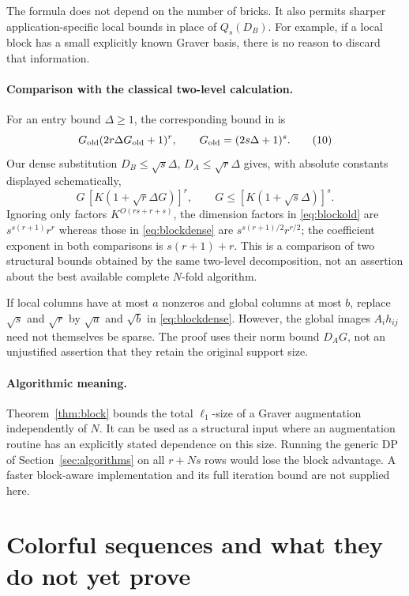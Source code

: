 \documentclass[11pt]{article}
\theoremstyle{definition}
\theoremstyle{remark}
\begin{document}
The formula does not depend on the number of bricks. It also permits
sharper application-specific local bounds in place of $Q_s(D_B)$.
For example, if a local block has a small explicitly known Graver basis,
there is no reason to discard that information.

\paragraph{Comparison with the classical two-level calculation.}
For an entry bound $\Delta\ge1$, the corresponding bound in
\cite[Lemma 3]{EHK} is
\[
 G_{\rm old}(2r\Delta G_{\rm old}+1)^r,
 \qquad G_{\rm old}=(2s\Delta+1)^s.
 \tag{10}\label{eq:blockold}
\]
Our dense substitution $D_B\le\sqrt s\Delta$, $D_A\le\sqrt r\Delta$
gives, with absolute constants displayed schematically,
\[
 G\,[K(1+\sqrt r\Delta G)]^r,
 \qquad G\le[K(1+\sqrt s\Delta)]^s.
 \tag{11}\label{eq:blockdense}
\]
Ignoring only factors $K^{O(rs+r+s)}$, the dimension factors in
\eqref{eq:blockold} are $s^{s(r+1)}r^r$ whereas those in
\eqref{eq:blockdense} are $s^{s(r+1)/2}r^{r/2}$; the coefficient exponent
in both comparisons is $s(r+1)+r$. This is a comparison of two structural
bounds obtained by the same two-level decomposition, not an assertion
about the best available complete $N$-fold algorithm.

If local columns have at most $a$ nonzeros and global columns at most
$b$, replace $\sqrt s$ and $\sqrt r$ by $\sqrt a$ and $\sqrt b$ in
\eqref{eq:blockdense}. However, the global images $A_i h_{ij}$ need not
themselves be sparse. The proof uses their norm bound $D_A G$, not an
unjustified assertion that they retain the original support size.

\paragraph{Algorithmic meaning.}
Theorem~\ref{thm:block} bounds the total $\ell_1$-size of a Graver
augmentation independently of $N$. It can be used as a structural input
where an augmentation routine has an explicitly stated dependence on
this size. Running the generic DP of Section~\ref{sec:algorithms} on
all $r+Ns$ rows would lose the block advantage. A faster block-aware
implementation and its full iteration bound are not supplied here.

\section{Colorful sequences and what they do not yet prove}\label{sec:colorful}
\end{document}
